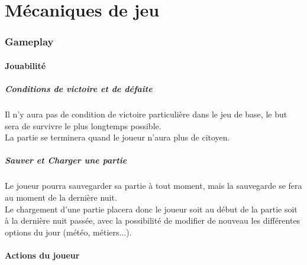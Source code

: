 \documentclass[a4paper]{article}
\newcommand{\alinea}{\hspace*{0.5cm}}
\begin{document}

  \newpage
  \part{Mécaniques de jeu}
    \section{Gameplay}
      \subsection{Jouabilité}
        \subsubsection{Conditions de victoire et de défaite}
          \alinea Il n'y aura pas de condition de victoire particulière dans le jeu de base, le but sera de survivre le plus longtemps possible.\\
          La partie se terminera quand le joueur n'aura plus de citoyen.
        \subsubsection{Sauver et Charger une partie}
          \alinea Le joueur pourra sauvegarder sa partie à tout moment, mais la sauvegarde se fera au moment de la dernière nuit.\\
          Le chargement d'une partie placera donc le joueur soit au début de la partie soit à la dernière nuit passée, avec la possibilité de modifier de nouveau les différentes options du jour (météo, métiers...).


	\subsection{Actions du joueur}
\end{document}
